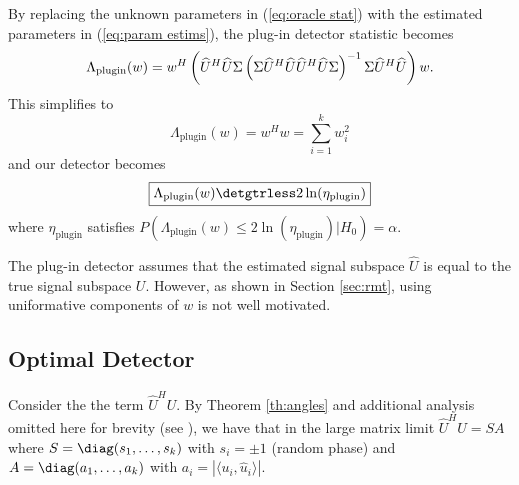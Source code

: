 By replacing the unknown parameters in (\ref{eq:oracle stat}) with the estimated parameters in (\ref{eq:param estims}), the plug-in detector statistic becomes
\begin{equation*}
\Lambda_{\text{plugin}}(w)= w^H\left(\widehat{U}^H\widehat{U}\Sigma\left(\Sigma\widehat{U}^H\widehat{U}\widehat{U}^H\widehat{U}\Sigma\right)^{-1}\Sigma\widehat{U}^H\widehat{U}\right)w.\\
\end{equation*}
This simplifies to
\begin{equation}\label{eq:plugin stat}
\boxed{\Lambda_{\text{plugin}}(w) = w^Hw=\sum_{i=1}^kw_i^2}
\end{equation}
and our detector becomes
\begin{equation}\label{eq:plugin classifier}
\boxed{\Lambda_{\text{plugin}}(w) \detgtrless 2\ln(\eta_{\text{plugin}})}
\end{equation}
where $\eta_{\text{plugin}}$ satisfies $P(\Lambda_{\text{plugin}}(w)\leq2\ln\left(\eta_{\text{plugin}}\right)|H_0)=\alpha$.

The plug-in detector assumes that the estimated signal subspace $\widehat{U}$ is equal to the true signal subspace $U$. However, as shown in Section \ref{sec:rmt}, using uniformative components of $w$ is not well motivated.

\subsection{Optimal Detector}\label{subsec:optdet}

Consider the the term $\widehat{U}^HU$. By Theorem \ref{th:angles} and additional analysis omitted here for brevity (see \cite{asendorf}), we have that in the large matrix limit $\widehat{U}^HU=SA$ where $S=\diag(s_1,\dots,s_{k})$ with $s_i=\pm1$ (random phase) and $A=\diag(a_1,\dots,a_k)$ with $a_i=|\langle u_i,\widehat{u}_i\rangle|$.


